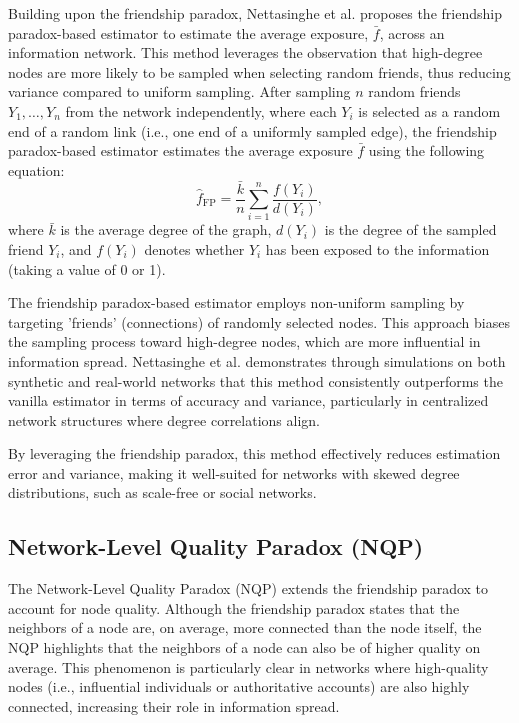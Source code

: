 \documentclass{article}
\begin{document}
Building upon the friendship paradox, Nettasinghe et al. proposes the friendship paradox-based estimator to estimate the average exposure, \( \bar{f} \), across an information network. This method leverages the observation that high-degree nodes are more likely to be sampled when selecting random friends, thus reducing variance compared to uniform sampling. After sampling \( n \) random friends \( Y_1, \dots, Y_n \) from the network independently, where each \( Y_i \) is selected as a random end of a random link (i.e., one end of a uniformly sampled edge), the friendship paradox-based estimator estimates the average exposure \( \bar{f} \) using the following equation:
\[
\hat{f}_{\text{FP}} = \frac{\bar{k}}{n} \sum_{i=1}^n \frac{f(Y_i)}{d(Y_i)},
\]
where \( \bar{k} \) is the average degree of the graph, \( d(Y_i) \) is the degree of the sampled friend \( Y_i \), and \( f(Y_i) \) denotes whether \( Y_i \) has been exposed to the information (taking a value of 0 or 1).

The friendship paradox-based estimator employs non-uniform sampling by targeting 'friends' (connections) of randomly selected nodes. This approach biases the sampling process toward high-degree nodes, which are more influential in information spread. Nettasinghe et al. demonstrates through simulations on both synthetic and real-world networks that this method consistently outperforms the vanilla estimator in terms of accuracy and variance, particularly in centralized network structures where degree correlations align.

By leveraging the friendship paradox, this method effectively reduces estimation error and variance, making it well-suited for networks with skewed degree distributions, such as scale-free or social networks.

\subsection{Network-Level Quality Paradox (NQP)} 

The Network-Level Quality Paradox (NQP) extends the friendship paradox to account for node quality. Although the friendship paradox states that the neighbors of a node are, on average, more connected than the node itself, the NQP highlights that the neighbors of a node can also be of higher quality on average. This phenomenon is particularly clear in networks where high-quality nodes (i.e., influential individuals or authoritative accounts) are also highly connected, increasing their role in information spread.
\end{document}

